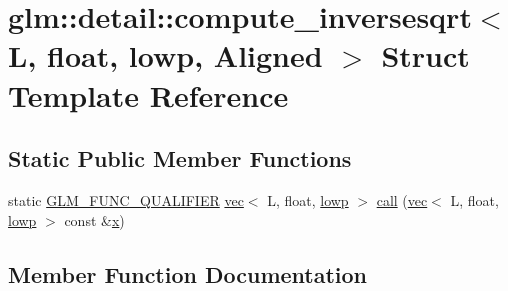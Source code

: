 \hypertarget{structglm_1_1detail_1_1compute__inversesqrt_3_01_l_00_01float_00_01lowp_00_01_aligned_01_4}{}\section{glm\+:\+:detail\+:\+:compute\+\_\+inversesqrt$<$ L, float, lowp, Aligned $>$ Struct Template Reference}
\label{structglm_1_1detail_1_1compute__inversesqrt_3_01_l_00_01float_00_01lowp_00_01_aligned_01_4}
\subsection*{Static Public Member Functions}
\begin{DoxyCompactItemize}
\item 
static \mbox{\hyperlink{setup_8hpp_a33fdea6f91c5f834105f7415e2a64407}{G\+L\+M\+\_\+\+F\+U\+N\+C\+\_\+\+Q\+U\+A\+L\+I\+F\+I\+ER}} \mbox{\hyperlink{structglm_1_1vec}{vec}}$<$ L, float, \mbox{\hyperlink{namespaceglm_a36ed105b07c7746804d7fdc7cc90ff25ae161af3fc695e696ce3bf69f7332bc2d}{lowp}} $>$ \mbox{\hyperlink{structglm_1_1detail_1_1compute__inversesqrt_3_01_l_00_01float_00_01lowp_00_01_aligned_01_4_afac251e9e18084ffd62fe54d0c2c0a32}{call}} (\mbox{\hyperlink{structglm_1_1vec}{vec}}$<$ L, float, \mbox{\hyperlink{namespaceglm_a36ed105b07c7746804d7fdc7cc90ff25ae161af3fc695e696ce3bf69f7332bc2d}{lowp}} $>$ const \&\mbox{\hyperlink{_s_d_l__opengl_8h_ad0e63d0edcdbd3d79554076bf309fd47}{x}})
\end{DoxyCompactItemize}


\subsection{Member Function Documentation}
\mbox{\label{structglm_1_1detail_1_1compute__inversesqrt_3_01_l_00_01float_00_01lowp_00_01_aligned_01_4_afac251e9e18084ffd62fe54d0c2c0a32}} 
